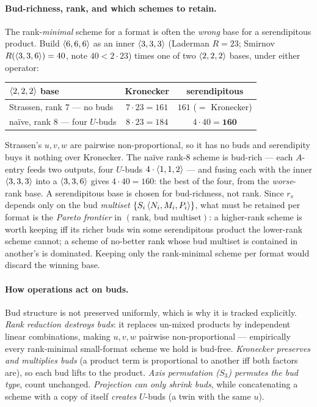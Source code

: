 \paragraph{Bud-richness, rank, and which schemes to retain.} The rank-\emph{minimal}
scheme for a format is often the \emph{wrong} base for a serendipitous product. Build
\(\langle 6, 6, 6 \rangle\) as an inner \(\langle 3, 3, 3 \rangle\) (Laderman \(R=23\); Smirnov
\(R(\langle 3, 3, 6 \rangle)=40\), note \(40<2\cdot 23\)) times one of two \(\langle 2, 2, 2 \rangle\)
bases, under either operator:
\begin{center}
\begin{tabular}{lcc}
\toprule
\(\langle 2, 2, 2 \rangle\) base & Kronecker & serendipitous \\
\midrule
Strassen, rank \(7\) --- no buds & \(7\cdot 23 = 161\) & \(161\) (\(=\) Kronecker) \\
na\"ive, rank \(8\) --- four \(U\)-buds & \(8\cdot 23 = 184\) & \(4\cdot 40 = \mathbf{160}\) \\
\bottomrule
\end{tabular}
\end{center}
Strassen's \(u,v,w\) are pairwise non-proportional, so it has no buds and serendipity buys
it nothing over Kronecker. The na\"ive rank-\(8\) scheme is bud-rich --- each \(A\)-entry
feeds two outputs, four \(U\)-buds \(4\cdot\langle 1, 1, 2 \rangle\) --- and fusing each with the
inner \(\langle 3, 3, 3 \rangle\) into a \(\langle 3, 3, 6 \rangle\) gives \(4\cdot 40 = 160\): the
best of the four, from the \emph{worse}-rank base. A serendipitous base is chosen for
bud-richness, not rank. Since \(r_s\) depends only on the bud \emph{multiset}
\(\{S_i\,\langle N_i, M_i, P_i \rangle\}\), what must be retained per format is the
\emph{Pareto frontier} in \((\text{rank},\,\text{bud multiset})\): a higher-rank scheme is
worth keeping iff its richer buds win some serendipitous product the lower-rank scheme
cannot; a scheme of no-better rank whose bud multiset is contained in another's is
dominated. Keeping only the rank-minimal scheme per format would discard the winning base.

\paragraph{How operations act on buds.} Bud structure is not preserved uniformly, which is
why it is tracked explicitly. \emph{Rank reduction destroys buds}: it replaces un-mixed
products by independent linear combinations, making \(u,v,w\) pairwise non-proportional ---
empirically every rank-minimal small-format scheme we hold is bud-free. \emph{Kronecker
preserves and multiplies buds} (a product term is proportional to another iff both factors
are), so each bud lifts to the product. \emph{Axis permutation (\(S_3\)) permutes the bud
type}, count unchanged. \emph{Projection can only shrink buds}, while concatenating a
scheme with a copy of itself \emph{creates} \(U\)-buds (a twin with the same \(u\)).

